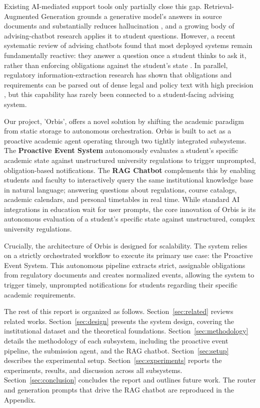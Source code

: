 \documentclass[a4paper,12pt]{article}
\begin{document}
Existing AI-mediated support tools only partially close this gap. Retrieval-Augmented Generation grounds a generative model's answers in source documents and substantially reduces hallucination \cite{lewis2020retrieval}, and a growing body of advising-chatbot research applies it to student questions. However, a recent systematic review of advising chatbots found that most deployed systems remain fundamentally reactive: they answer a question once a student thinks to ask it, rather than enforcing obligations against the student's state \cite{assayed2024systematic}. In parallel, regulatory information-extraction research has shown that obligations and requirements can be parsed out of dense legal and policy text with high precision \cite{zhang2016semantic, galli2025aiAct}, but this capability has rarely been connected to a student-facing advising system.

Our project, 'Orbis', offers a novel solution by shifting the academic paradigm from static storage to autonomous orchestration. Orbis is built to act as a proactive academic agent operating through two tightly integrated subsystems. The \textbf{Proactive Event System} autonomously evaluates a student's specific academic state against unstructured university regulations to trigger unprompted, obligation-based notifications. The \textbf{RAG Chatbot} complements this by enabling students and faculty to interactively query the same institutional knowledge base in natural language; answering questions about regulations, course catalogs, academic calendars, and personal timetables in real time. While standard AI integrations in education wait for user prompts, the core innovation of Orbis is its autonomous evaluation of a student's specific state against unstructured, complex university regulations.

Crucially, the architecture of Orbis is designed for scalability. The system relies on a strictly orchestrated workflow to execute its primary use case: the Proactive Event System. This autonomous pipeline extracts strict, assignable obligations from regulatory documents and creates normalized events, allowing the system to trigger timely, unprompted notifications for students regarding their specific academic requirements.

The rest of this report is organized as follows. Section~\ref{sec:related} reviews related works. Section~\ref{sec:design} presents the system design, covering the institutional dataset and the theoretical foundations. Section~\ref{sec:methodology} details the methodology of each subsystem, including the proactive event pipeline, the submission agent, and the RAG chatbot. Section~\ref{sec:setup} describes the experimental setup. Section~\ref{sec:experiments} reports the experiments, results, and discussion across all subsystems. Section~\ref{sec:conclusion} concludes the report and outlines future work. The router and generation prompts that drive the RAG chatbot are reproduced in the Appendix.
\end{document}
